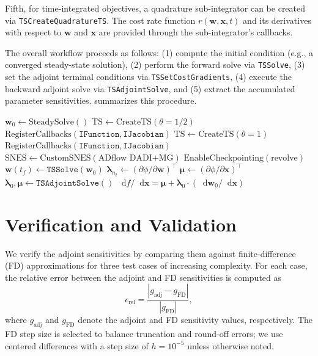 \documentclass[journal]{new-aiaa}
\newcommand{\f}[2]{\frac{#1}{#2}}
\newcommand{\mb}[1]{\mathbf{#1}}
\newcommand{\mbg}[1]{\bm{#1}}
\renewcommand{\d}{\mathop{}\!\mathrm{d}} %
\newcommand{\p}{\partial}
\begin{document}
Fifth, for time-integrated objectives, a quadrature sub-integrator can be created via \texttt{TSCreateQuadratureTS}.
The cost rate function $r(\mb{w}, \mb{x}, t)$ and its derivatives with respect to $\mb{w}$ and $\mb{x}$ are provided through the sub-integrator's callbacks.

The overall workflow proceeds as follows: (1) compute the initial condition (e.g., a converged steady-state solution), (2) perform the forward solve via \texttt{TSSolve}, (3) set the adjoint terminal conditions via \texttt{TSSetCostGradients}, (4) execute the backward adjoint solve via \texttt{TSAdjointSolve}, and (5) extract the accumulated parameter sensitivities.
 summarizes this procedure.

\begin{algorithm}[t]
\caption{Time-accurate adjoint workflow in ADflow.  Steps 2--3 differ between the two forward solver strategies; all other steps are shared.}\label{alg:workflow}
\begin{algorithmic}[1]
\State $\mb{w}_0 \gets \text{SteadySolve}()$ 
    \State $\text{TS} \gets \text{CreateTS}(\theta = 1/2)$ 
    \State $\text{RegisterCallbacks}(\texttt{IFunction}, \texttt{IJacobian})$
    \State $\text{TS} \gets \text{CreateTS}(\theta = 1)$ 
    \State $\text{RegisterCallbacks}(\texttt{IFunction}, \texttt{IJacobian})$
    \State $\text{SNES} \gets \text{CustomSNES}(\text{ADflow DADI+MG})$ 
\EndIf
\State $\text{EnableCheckpointing}(\text{revolve})$
\State $\mb{w}(t_f) \gets \texttt{TSSolve}(\mb{w}_0)$ 
\State $\mbg{\lambda}_{n_t} \gets (\p \phi / \p \mb{w})^\intercal$ 
\State $\mbg{\mu} \gets (\p \phi / \p \mb{x})^\intercal$ 
\State $\mbg{\lambda}_0, \mbg{\mu} \gets \texttt{TSAdjointSolve}()$ 
\State $\d f/\d \mb{x} = \mbg{\mu} + \mbg{\lambda}_0 \cdot (\d \mb{w}_0 / \d \mb{x})$ 
\end{algorithmic}
\end{algorithm}

\section{Verification and Validation}\label{sec:verification}
We verify the adjoint sensitivities by comparing them against finite-difference (FD) approximations for three test cases of increasing complexity.
For each case, the relative error between the adjoint and FD sensitivities is computed as
\begin{equation}\label{eq:rel_error}
\epsilon_{\text{rel}} = \f{\left| g_{\text{adj}} - g_{\text{FD}} \right|}{\left| g_{\text{FD}} \right|},
\end{equation}
where $g_{\text{adj}}$ and $g_{\text{FD}}$ denote the adjoint and FD sensitivity values, respectively.
The FD step size is selected to balance truncation and round-off errors; we use centered differences with a step size of $h = 10^{-5}$ unless otherwise noted.
\end{document}
